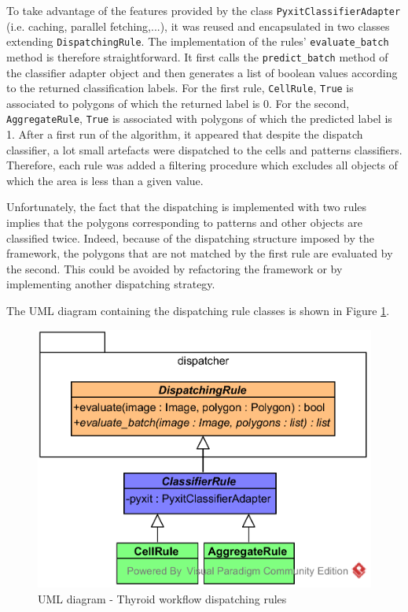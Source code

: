 To take advantage of the features provided by the class \texttt{PyxitClassifierAdapter} (i.e. caching, parallel fetching,...), it was reused and encapsulated in two classes extending \texttt{DispatchingRule}. The implementation of the rules' \texttt{evaluate\_batch} method is therefore straightforward. It first calls the \texttt{predict\_batch} method of the classifier adapter object and then generates a list of boolean values according to the returned classification labels. For the first rule, \texttt{CellRule}, \texttt{True} is associated to polygons of which the returned label is 0. For the second, \texttt{AggregateRule}, \texttt{True} is associated with polygons of which the predicted label is 1. After a first run of the algorithm, it appeared that despite the dispatch classifier, a lot small artefacts were dispatched to the cells and patterns classifiers. Therefore, each rule was added a filtering procedure which excludes all objects of which the area is less than a given value. 

Unfortunately, the fact that the dispatching is implemented with two rules implies that the polygons corresponding to patterns and other objects are classified twice. Indeed, because of the dispatching structure imposed by the framework, the polygons that are not matched by the first rule are evaluated by the second. This could be avoided by refactoring the framework or by implementing another dispatching strategy.

The UML diagram containing the dispatching rule classes is shown in Figure \ref{fig:uml_cyto_disp_rules}.

\begin{figure}
	\center
	\includegraphics[scale=0.85]{image/thyroid_dispatching_rules.png}
	\caption{UML diagram - Thyroid workflow dispatching rules}
	\label{fig:uml_cyto_disp_rules}
\end{figure}

